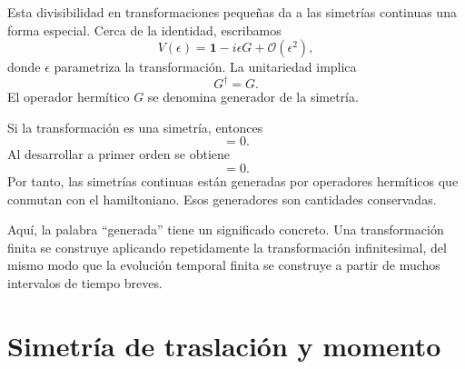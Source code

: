 Esta divisibilidad en transformaciones pequeñas da a las simetrías continuas una forma especial. Cerca de la identidad, escribamos
\begin{equation}
V(\epsilon)
=
\mathbf 1-i\epsilon G+\mathcal O(\epsilon^2),
\end{equation}
donde \(\epsilon\) parametriza la transformación. La unitariedad implica
\begin{equation}
G^\dagger=G.
\end{equation}
El operador hermítico \(G\) se denomina generador de la simetría.

Si la transformación es una simetría, entonces
\begin{equation}
[H,V(\epsilon)]=0.
\end{equation}
Al desarrollar a primer orden se obtiene
\begin{equation}
[H,G]=0.
\end{equation}
Por tanto, las simetrías continuas están generadas por operadores hermíticos que conmutan con el hamiltoniano. Esos generadores son cantidades conservadas.

Aquí, la palabra ``generada'' tiene un significado concreto. Una transformación finita se construye aplicando repetidamente la transformación infinitesimal, del mismo modo que la evolución temporal finita se construye a partir de muchos intervalos de tiempo breves.

\section{Simetría de traslación y momento}


